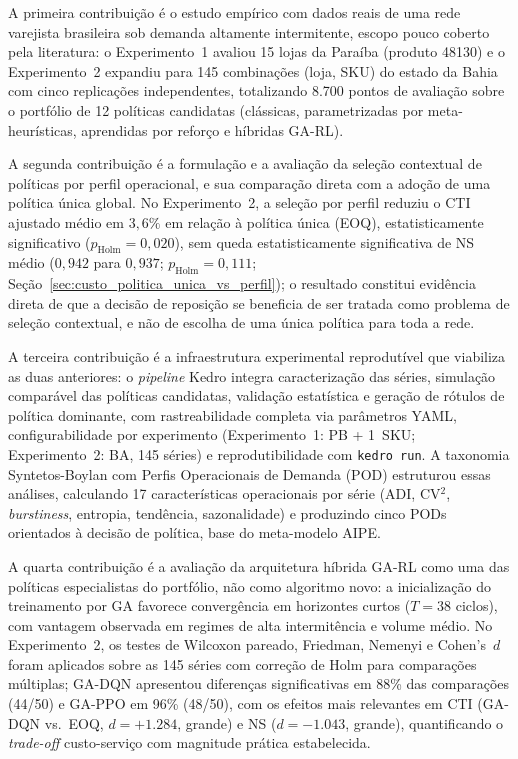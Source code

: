 A primeira contribuição é o estudo empírico com dados reais de uma rede varejista brasileira sob demanda altamente intermitente, escopo pouco coberto pela literatura: o Experimento~1 avaliou 15 lojas da Paraíba (produto 48130) e o Experimento~2 expandiu para 145 combinações (loja, SKU) do estado da Bahia com cinco replicações independentes, totalizando 8.700 pontos de avaliação sobre o portfólio de 12 políticas candidatas (clássicas, parametrizadas por meta-heurísticas, aprendidas por reforço e híbridas GA-RL).

A segunda contribuição é a formulação e a avaliação da seleção contextual de políticas por perfil operacional, e sua comparação direta com a adoção de uma política única global. No Experimento~2, a seleção por perfil reduziu o CTI ajustado médio em $3{,}6\%$ em relação à política única (EOQ), estatisticamente significativo ($p_{\text{Holm}}=0{,}020$), sem queda estatisticamente significativa de NS médio ($0{,}942$ para $0{,}937$; $p_{\text{Holm}}=0{,}111$; Seção~\ref{sec:custo_politica_unica_vs_perfil}); o resultado constitui evidência direta de que a decisão de reposição se beneficia de ser tratada como problema de seleção contextual, e não de escolha de uma única política para toda a rede.

A terceira contribuição é a infraestrutura experimental reprodutível que viabiliza as duas anteriores: o \textit{pipeline} Kedro integra caracterização das séries, simulação comparável das políticas candidatas, validação estatística e geração de rótulos de política dominante, com rastreabilidade completa via parâmetros YAML, configurabilidade por experimento (Experimento~1: PB + 1~SKU; Experimento~2: BA, 145 séries) e reprodutibilidade com \texttt{kedro run}. A taxonomia Syntetos-Boylan com Perfis Operacionais de Demanda (POD) estruturou essas análises, calculando 17 características operacionais por série (ADI, CV$^2$, \textit{burstiness}, entropia, tendência, sazonalidade) e produzindo cinco PODs orientados à decisão de política, base do meta-modelo AIPE.

A quarta contribuição é a avaliação da arquitetura híbrida GA-RL como uma das políticas especialistas do portfólio, não como algoritmo novo: a inicialização do treinamento por GA favorece convergência em horizontes curtos ($T=38$ ciclos), com vantagem observada em regimes de alta intermitência e volume médio. No Experimento~2, os testes de Wilcoxon pareado, Friedman, Nemenyi e Cohen's~$d$ foram aplicados sobre as 145 séries com correção de Holm para comparações múltiplas; GA-DQN apresentou diferenças significativas em 88\% das comparações (44/50) e GA-PPO em 96\% (48/50), com os efeitos mais relevantes em CTI (GA-DQN vs.\ EOQ, $d=+1.284$, grande) e NS ($d=-1.043$, grande), quantificando o \textit{trade-off} custo-serviço com magnitude prática estabelecida.

